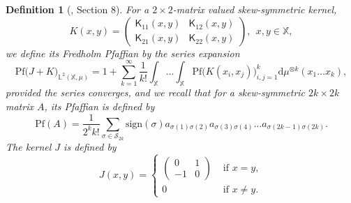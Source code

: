 \documentclass[12pt,a4paper]{amsart}
\newtheorem{definition}[theorem]{Definition}
\theoremstyle{remark}
\numberwithin{equation}{section} \numberwithin{theorem}{section}
\newcommand{\Pf}{\ensuremath{\mathrm{Pf}}}
\newcommand{\kernel}{\mathsf{K}}
\newcommand{\sign}{\ensuremath{\mathrm{sign}}}
\begin{document}
\begin{definition}[\cite{Rai00}, Section 8]
For a $2\times 2$-matrix valued  skew-symmetric kernel,
$$ K(x,y) = \begin{pmatrix}
\kernel_{11}(x,y) & \kernel_{12}(x,y)\\
\kernel_{21}(x, y) & \kernel_{22}(x,y)
\end{pmatrix},\ \ x,y\in \mathbb{X},$$
we define its Fredholm Pfaffian by the series expansion
\begin{equation}
\Pf\big(J+K\big)_{\mathbb{L}^2(\mathbb{X},\mu)} = 1+\sum_{k=1}^{\infty} \frac{1}{k!}
\int_{\mathbb{X}} \dots \int_{\mathbb{X}}  \Pf\Big( K(x_i, x_j)\Big)_{i,j=1}^k \mathrm{d}\mu^{\otimes k}(x_1 \dots x_k),
\label{eq:defFredholmPfaffian}
\end{equation}
provided the series converges, and we recall that for a skew-symmetric  $2k\times 2k$ matrix $A$, its Pfaffian is defined by
\begin{equation}
 \Pf(A) = \frac{1}{2^k k!} \sum_{\sigma\in\mathcal{S}_{2k}} \sign(\sigma) a_{\sigma(1)\sigma(2)}a_{\sigma(3)\sigma(4)} \dots a_{\sigma(2k-1)\sigma(2k)}.
 \label{def:pfaffian}
\end{equation}
The kernel $J$ is defined by 
$$ J(x,y)  = \begin{cases}
\begin{pmatrix}
0 & 1\\-1 & 0
\end{pmatrix} & \text{ if }x=y, \\
0& \text{ if }x\neq y.
\end{cases}$$
\label{def:FredholmPfaffian}
\end{definition}
\end{document}
